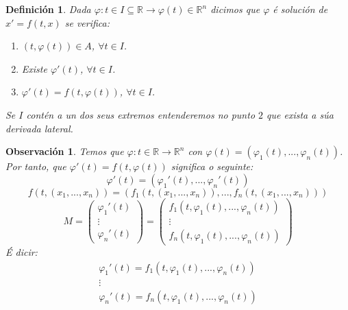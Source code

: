 \documentclass[11pt, a4paper,twoside]{article}
\newcommand{\iindex}[1]{\emph{#1}\index{#1}}
\theoremstyle{theorem-style}  %
\theoremstyle{definition-style}
\newtheorem{definition}{Definición}[section]
\newtheorem*{observation}{Observación} %
\theoremstyle{example-style}
\begin{document}
\begin{definition}
	Dada $\varphi: t \in I \subseteq \mathbb{R} \longrightarrow \varphi (t) \in \mathbb{R}^n$ dicimos que $\varphi$ é \iindex{solución} de $x'=f(t, x)$ se verifica:
	\begin{enumerate}[\quad i)]
		\item $(t, \varphi (t)) \in A$, $\forall t \in I$.
		\item Existe $ \varphi' (t)$, $\forall t \in I$.
		\item $\varphi'(t)=f(t, \varphi(t))$,  $\forall t \in I$.
	\end{enumerate}
	Se $I$ contén a un dos seus extremos entenderemos no punto $2$ que exista a súa derivada lateral.
\end{definition}
\begin{observation}
	Temos que $\varphi: t \in \mathbb{R} \longrightarrow \mathbb{R}^n$ con $\varphi (t) = (\varphi_1 (t), ..., \varphi_n (t))$. Por tanto, que $\varphi' (t) = f(t, \varphi (t))$ significa o seguinte:
	\[\varphi' (t) = (\varphi_1' (t), ..., \varphi_n' (t))\] 
	\[f(t, (x_1, ..., x_n)) = (f_1(t, (x_1, ..., x_n)), ..., f_n(t, (x_1, ..., x_n))) \]
	\[
	M=
	\left({\begin{array}{cc}
		\varphi_1' (t) \\
		\vdots \\
		\varphi_n' (t)
		\end{array} } \right)
	=
	\left({\begin{array}{cc}
		f_1(t, \varphi_1 (t), ..., \varphi_n (t)) \\
		\vdots \\
		f_n(t, \varphi_1 (t), ..., \varphi_n (t))
		\end{array} } \right)
	\]
	É dicir:
	\[\left . {\begin{array}{cc}
		\varphi_1' (t) = f_1(t, \varphi_1 (t), ..., \varphi_n (t)) \\
		\vdots \\
		\varphi_n' (t) = f_n(t, \varphi_1 (t), ..., \varphi_n (t))
		\end{array} } \right. \]
\end{observation}
\end{document}
